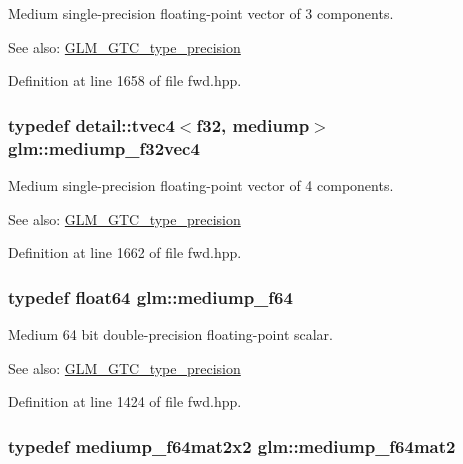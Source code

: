 Medium single-precision floating-point vector of 3 components. \begin{Desc}
\item[See also:]\hyperlink{group__gtc__type__precision}{GLM\_\-GTC\_\-type\_\-precision} \end{Desc}


Definition at line 1658 of file fwd.hpp.\hypertarget{group__gtc__type__precision_ga5a1b058d185d87504591a11c6247518}{
\subsubsection[mediump\_\-f32vec4]{\setlength{\rightskip}{0pt plus 5cm}typedef detail::tvec4$<$f32, mediump$>$ {\bf glm::mediump\_\-f32vec4}}}
\label{group__gtc__type__precision_ga5a1b058d185d87504591a11c6247518}


Medium single-precision floating-point vector of 4 components. \begin{Desc}
\item[See also:]\hyperlink{group__gtc__type__precision}{GLM\_\-GTC\_\-type\_\-precision} \end{Desc}


Definition at line 1662 of file fwd.hpp.\hypertarget{group__gtc__type__precision_gbd273bd38ea5e013aeec9ffd2b2591fb}{
\subsubsection[mediump\_\-f64]{\setlength{\rightskip}{0pt plus 5cm}typedef float64 {\bf glm::mediump\_\-f64}}}
\label{group__gtc__type__precision_gbd273bd38ea5e013aeec9ffd2b2591fb}


Medium 64 bit double-precision floating-point scalar. \begin{Desc}
\item[See also:]\hyperlink{group__gtc__type__precision}{GLM\_\-GTC\_\-type\_\-precision} \end{Desc}


Definition at line 1424 of file fwd.hpp.\hypertarget{group__gtc__type__precision_ga7eac0340d2aaf670ec4dfbd1826fd35}{
\subsubsection[mediump\_\-f64mat2]{\setlength{\rightskip}{0pt plus 5cm}typedef mediump\_\-f64mat2x2 {\bf glm::mediump\_\-f64mat2}}}
\label{group__gtc__type__precision_ga7eac0340d2aaf670ec4dfbd1826fd35}



